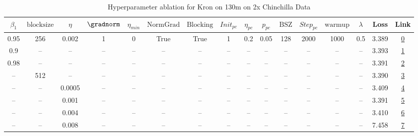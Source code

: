 \begin{table}[H]
\centering
\caption{Hyperparameter ablation for Kron on 130m on 2x Chinchilla Data}
\label{tab:ablation_kron_130m_on_2x_chinchilla_data}
\begin{tabular}{cccccccccccccccc}
\toprule
$\beta_1$ & $\mathrm{block size}$ & $\eta$ & $\gradnorm$ & $\eta_{min}$ & $\mathrm{NormGrad}$ & $\mathrm{Blocking}$ & $Init_{pc}$ & $\eta_{pc}$ & $p_{pc}$ & $\mathrm{BSZ}$ & $Step_{pc}$ & $\mathrm{warmup}$ & $\lambda$ & Loss & Link \\
\midrule
0.95 & 256 & 0.002 & 1 & 0 & True & True & 1 & 0.2 & 0.05 & 128 & 2000 & 1000 & 0.5 & 3.389 & \href{https://wandb.ai/stanford-mercury/optimizer-scaling/runs/sweep-130m-5B-kron45d4b7lr0.002-wd0.5-b10.95-plr0.2-pis1-gn1-nor-c54de5}{0} \\
\midrule
0.9 & -- & -- & -- & -- & -- & -- & -- & -- & -- & -- & -- & -- & -- & 3.393 & \href{https://wandb.ai/stanford-mercury/optimizer-scaling/runs/sweep-130m-5B-kronc6e4f0lr0.002-wd0.5-b10.9-plr0.2-pis1-gn1-norm-b99f14}{1} \\
0.98 & -- & -- & -- & -- & -- & -- & -- & -- & -- & -- & -- & -- & -- & 3.391 & \href{https://wandb.ai/stanford-mercury/optimizer-scaling/runs/sweep-130m-5B-kron446e3clr0.002-wd0.5-b10.98-plr0.2-pis1-gn1-nor-60f801}{2} \\
-- & 512 & -- & -- & -- & -- & -- & -- & -- & -- & -- & -- & -- & -- & 3.390 & \href{https://wandb.ai/stanford-mercury/optimizer-scaling/runs/sweep-130m-5B-kron47f90elr0.002-wd0.5-b10.95-plr0.2-pis1-gn1-nor-50b12f}{3} \\
-- & -- & 0.0005 & -- & -- & -- & -- & -- & -- & -- & -- & -- & -- & -- & 3.409 & \href{https://wandb.ai/stanford-mercury/optimizer-scaling/runs/sweep-130m-5B-kronc5113alr0.0005-wd0.5-b10.95-plr0.2-pis1-gn1-no-25eea5}{4} \\
-- & -- & 0.001 & -- & -- & -- & -- & -- & -- & -- & -- & -- & -- & -- & 3.391 & \href{https://wandb.ai/stanford-mercury/optimizer-scaling/runs/sweep-130m-5B-kron0d84f8lr0.001-wd0.5-b10.95-plr0.2-pis1-gn1-nor-9cbb80}{5} \\
-- & -- & 0.004 & -- & -- & -- & -- & -- & -- & -- & -- & -- & -- & -- & 3.410 & \href{https://wandb.ai/stanford-mercury/optimizer-scaling/runs/sweep-130m-5B-krone91591lr0.004-wd0.5-b10.95-plr0.2-pis1-gn1-nor-46e2ae}{6} \\
-- & -- & 0.008 & -- & -- & -- & -- & -- & -- & -- & -- & -- & -- & -- & 7.458 & \href{https://wandb.ai/stanford-mercury/optimizer-scaling/runs/sweep-130m-5B-kron4e53f2lr0.008-wd0.5-b10.95-plr0.2-pis1-gn1-nor-6c3cc4}{7} \\

\end{tabular}
\end{table}
